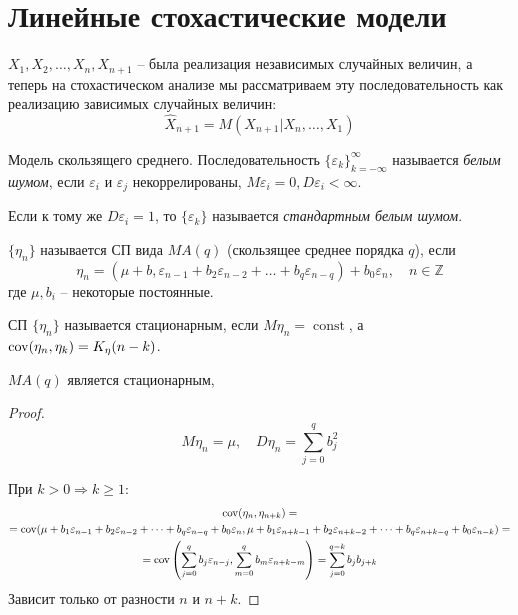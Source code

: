 
\section{Линейные стохастические модели}

$X_1, X_2, \dots, X_n, X_{n+1}$ -- была реализация независимых случайных величин,
а теперь на стохастическом анализе мы рассматриваем эту последовательность
как реализацию зависимых случайных величин:
\[
  \hat{X}_{n+1} = M \left( X_{n+1} | X_n, \dots, X_1 \right) 
\]


\begin{definition}
  Модель скользящего среднего.
  Последовательность $\{\varepsilon_k\}_{k=-\infty}^\infty$ называется \emph{белым шумом},
  если $\varepsilon_i$ и $\varepsilon_j$ некоррелированы,
  $M\varepsilon_i = 0, D\varepsilon_i < \infty$.

  Если к тому же $D\varepsilon_i = 1$, то $\{\varepsilon_k\}$ называется
  \emph{стандартным белым шумом}.
\end{definition}

\begin{definition}
  $\{\eta_n\}$ называется СП вида $MA(q)$ (скользящее среднее порядка $q$),
  если
  \[
    \eta_n = (\mu + b, \varepsilon_{n-1} + b_2 \varepsilon_{n-2} + \dots + b_q \varepsilon_{n-q}) + b_0 \varepsilon_n,
    \quad n \in \mathbb{Z}
  \]
  где $\mu, b_i$ -- некоторые постоянные.
\end{definition}

\begin{definition}
  СП $\{\eta_n\}$ называется стационарным, если $M\eta_n = \operatorname{const}$,
  а $\operatorname{cov} (\eta_n, \eta_k) = K_{\eta} (n-k)$.
\end{definition}

\begin{remark}
  $MA(q)$ является стационарным,
  \begin{proof}
    \[
      M\eta_n = \mu, \quad 
      D\eta_n = \sum_{j=0}^q b_j^2
    \]

    При $k > 0 \Rightarrow k \geqslant 1$:
    \begin{multline*}
      \operatorname{cov}(\eta_n, \eta_{n+k}) = \\
      = \operatorname{cov} (\mu + b_1 \varepsilon_{n-1} + b_2 \varepsilon_{n-2} + \dots + b_q \varepsilon_{n-q} + b_0 \varepsilon_n,
      \mu + b_1 \varepsilon_{n + k-1} + b_2 \varepsilon_{n + k - 2} + \dots + b_q \varepsilon_{n + k - q} + b_0 \varepsilon_{n-k}) = \\
      = \operatorname{cov} \left( \sum_{j=0}^q b_j \varepsilon_{n-j}, \sum_{m=0}^q b_m \varepsilon_{n+k-m} \right) 
      = \sum_{j=0}^{q-k} b_j b_{j+k}
    \end{multline*}
    Зависит только от разности $n$ и $n+k$.
  \end{proof}
\end{remark}

